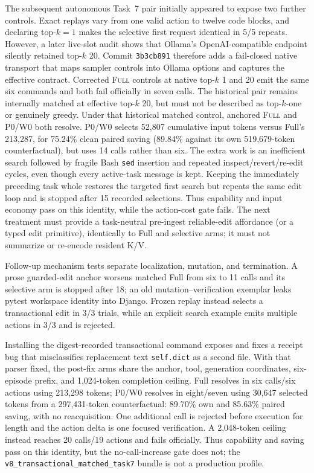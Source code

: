 \documentclass[11pt]{article}
\begin{document}
The subsequent autonomous Task~7 pair initially appeared to expose two further
controls.  Exact replays vary from one valid action to twelve code blocks, and
declaring top-$k=1$ makes the selective first request identical in 5/5 repeats.
However, a later live-slot audit shows that Ollama's OpenAI-compatible endpoint
silently retained top-$k$ 20.  Commit \texttt{3b3cb891} therefore adds a
fail-closed native transport that maps sampler controls into Ollama options and
captures the effective contract.  Corrected \textsc{Full} controls at native
top-$k$ 1 and 20 emit the same six commands and both fail officially in seven
calls.  The historical pair remains internally matched at effective top-$k$
20, but must not be described as top-$k$-one or genuinely greedy.  Under that
historical matched control, anchored \textsc{Full} and P0/W0 both resolve.
P0/W0 selects 52,807 cumulative input tokens versus Full's 213,287, for
75.24\% clean paired saving (89.84\% against its own 519,679-token
counterfactual), but uses 14 calls rather than six.  The extra work is an
inefficient search followed by fragile Bash \texttt{sed} insertion and repeated
inspect/revert/re-edit cycles, even though every active-task message is kept.
Keeping the immediately preceding task whole restores the targeted first
search but repeats the same edit loop and is stopped after 15 recorded
selections.  Thus capability and input economy pass on this identity, while
the action-cost gate fails.  The next treatment must provide a task-neutral
pre-ingest reliable-edit affordance (or a typed edit primitive), identically to
Full and selective arms; it must not summarize or re-encode resident K/V.

Follow-up mechanism tests separate localization, mutation, and termination.
A prose guarded-edit anchor worsens matched Full from six to 11 calls and its
selective arm is stopped after 18; an old mutation--verification exemplar leaks
pytest workspace identity into Django.  Frozen replay instead selects a
transactional edit in 3/3 trials, while an explicit search example emits
multiple actions in 3/3 and is rejected.

Installing the digest-recorded transactional command exposes and fixes a
receipt bug that misclassifies replacement text \texttt{self.dict} as a second
file.  With that parser fixed, the post-fix arms share the anchor, tool,
generation coordinates, six-episode prefix, and 1,024-token completion ceiling.
Full resolves in six calls/six actions using 213,298 tokens; P0/W0 resolves in
eight/seven using 30,647 selected tokens from a 297,431-token counterfactual:
89.70\% own and 85.63\% paired saving, with no reacquisition.  One additional
call is rejected before execution for length and the action delta is one focused
verification.  A 2,048-token ceiling instead reaches 20 calls/19 actions and
fails officially.  Thus capability and saving pass on this identity, but the
no-call-increase gate does not; the
\texttt{v8\_transactional\_matched\_task7} bundle is not a production profile.
\end{document}
